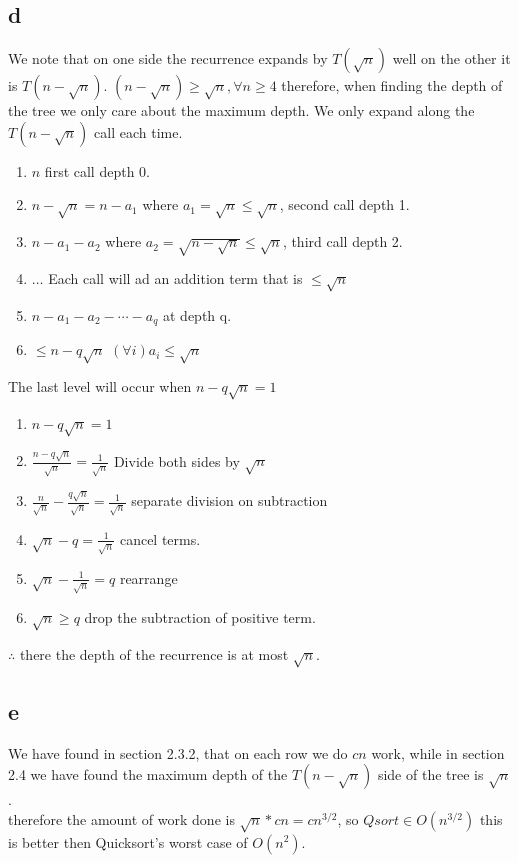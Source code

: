 \documentclass{article}
\begin{document}
    \subsection{d}
      We note that on one side the recurrence expands by $T(\sqrt{n})$ well on the other it is $T(n - \sqrt{n})$. $(n - \sqrt{n}) \geq \sqrt{n}, \forall n \geq 4$  therefore, when finding the depth of the tree we only care about the maximum depth. We only expand along the $T(n - \sqrt{n})$ call each time. \\
      \begin{enumerate}
        \item $n$ \hfill first call depth 0.
        \item $n - \sqrt{n} = n - a_{1}$ \hfill where $a_{1} = \sqrt{n} \leq \sqrt{n}$, second call depth 1.
        \item $n - a_{1} - a_{2}$ \hfill where $a_{2} = \sqrt{n - \sqrt{n}} \leq \sqrt{n}$, third call depth 2.
        \item $\ldots$ \hfill Each call will ad an addition term that is $\leq \sqrt{n}$
        \item $n - a_{1} - a_{2} - \cdots - a_{q}$ \hfill at depth q.
        \item $\leq n - q\sqrt{n}$ \hfill $(\forall i)a_{i} \leq \sqrt{n}$
      \end{enumerate}
      The last level will occur when $n - q\sqrt{n} = 1$ \\
      \begin{enumerate}
        \item $n - q\sqrt{n} = 1$ \hfill 
        \item $\frac{n - q\sqrt{n}}{\sqrt{n}} = \frac{1}{\sqrt{n}}$ \hfill Divide both sides by $\sqrt{n}$
        \item $\frac{n}{\sqrt{n}} - \frac{q\sqrt{n}}{\sqrt{n}} = \frac{1}{\sqrt{n}}$ \hfill separate division on subtraction
        \item $\sqrt{n} - q = \frac{1}{\sqrt{n}}$ \hfill cancel terms.
        \item $\sqrt{n} - \frac{1}{\sqrt{n}} = q$ \hfill rearrange
        \item $\sqrt{n} \geq q$ \hfill drop the subtraction of positive term.
      \end{enumerate}
      $\therefore$ there the depth of the recurrence is at most $\sqrt{n}$.
    \subsection{e}
      We have found in section 2.3.2, that on each row we do $cn$ work, while in section 2.4 we have found the maximum depth of the $T(n - \sqrt{n})$ side of the tree is $\sqrt{n}$.\\
      therefore the amount of work done is $\sqrt{n}*cn = cn^{3/2}$, so $Qsort \in O(n^{3/2})$ this is better then Quicksort's worst case of $O(n^{2})$.
\end{document}
